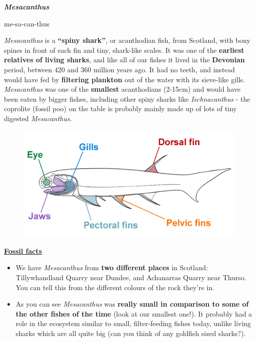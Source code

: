 \documentclass[12pt,letterpaper]{extarticle}
\begin{document}

{\Huge\textbf{\textit{Mesacanthus}}\par}
\vspace{3mm}
{\large{me-sa-can-thus} \par} 
\vspace{5mm}
\textit{Mesacanthus} is a \textbf{``spiny shark''}, or acanthodian fish, from Scotland, with bony spines in front of each fin and tiny, shark-like scales.  It was one of the \textbf{earliest relatives of living sharks}, and like all of our fishes it lived in the \textbf{Devonian} period, between 420 and 360 million years ago.  It had no teeth, and instead would have fed by \textbf{filtering plankton} out of the water with its sieve-like gills.  \textit{Mesacanthus} was one of the \textbf{smallest} acanthodians (2-15cm) and would have been eaten by bigger fishes, including other spiny sharks like \textit{Ischnacanthus} - the coprolite (fossil poo) on the table is probably mainly made up of lots of tiny digested \textit{Mesacanthus}.\newline

\begin{figure}[h!]
\includegraphics[scale=0.5]{Mesacanthus}
\centering
\end{figure}

{\large\textbf{\underline{Fossil facts}}\par}

\begin{itemize}
  \item We have \textit{Mesacanthus} from \textbf{two different places} in Scotland: Tillywhandland Quarry near Dundee, and Achanarras Quarry near Thurso.  You can tell this from the different colours of the rock they're in.
  \item As you can see \textit{Mesacanthus} was \textbf{really small in comparison to some of the other fishes of the time} (look at our smallest one!).  It probably had a role in the ecosystem similar to small, filter-feeding fishes today, unlike living sharks which are all quite big (can you think of any goldfish sized sharks?).
\end{itemize}
\end{document}
